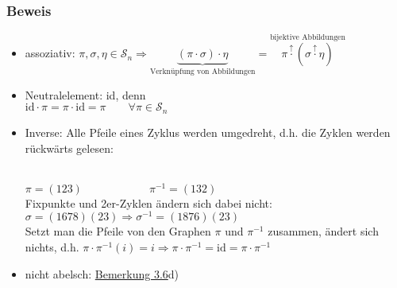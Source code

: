 \documentclass[12pt,titlepage, pdf]{article}
\newcommand{\id}{\textrm{id}}
\renewcommand{\>}{\rightarrow}
\renewcommand{\*}{\cdot}
\begin{document}
	      \subsubsection*{Beweis}
	      \begin{itemize}
	      	\item assoziativ: $\pi, \sigma, \eta \in \mathscr{S}_n \Rightarrow \underbrace{(\pi \cdot \sigma) \cdot \eta}_{\textrm{Verknüpfung von Abbildungen}} = \overset{\textrm{bijektive Abbildungen}}{\pi \overset{\uparrow}{\cdot} (\sigma \overset{\uparrow}{\cdot} \eta)}$
	      	\item Neutralelement: id, denn \\
	      	      $\id \cdot \pi = \pi \cdot \id = \pi\qquad\forall\pi\in\mathscr{S}_n$
	      	\item Inverse: Alle Pfeile eines Zyklus werden umgedreht, d.h. die Zyklen werden rückwärts gelesen:\\
	      	      \\
	      	      $\pi=(123)\qquad\qquad\qquad\pi^{-1}=(132)$\\
	      	      Fixpunkte und 2er-Zyklen ändern sich dabei nicht:\\
	      	      $\sigma = (1678)(23)\Rightarrow\sigma^{-1} = (1876)(23)$\\
	      	      Setzt man die Pfeile von den Graphen $\pi$ und $\pi^{-1}$ zusammen, ändert sich nichts, d.h. $\pi \cdot  \pi^{-1}(i) = i \Rightarrow \pi \cdot  \pi^{-1} = \id = \pi \cdot  \pi^{-1}$
	      	\item nicht abelsch: \hyperref[3.6]{Bemerkung 3.6}d)
	      \end{itemize}\newpage
\end{document}
